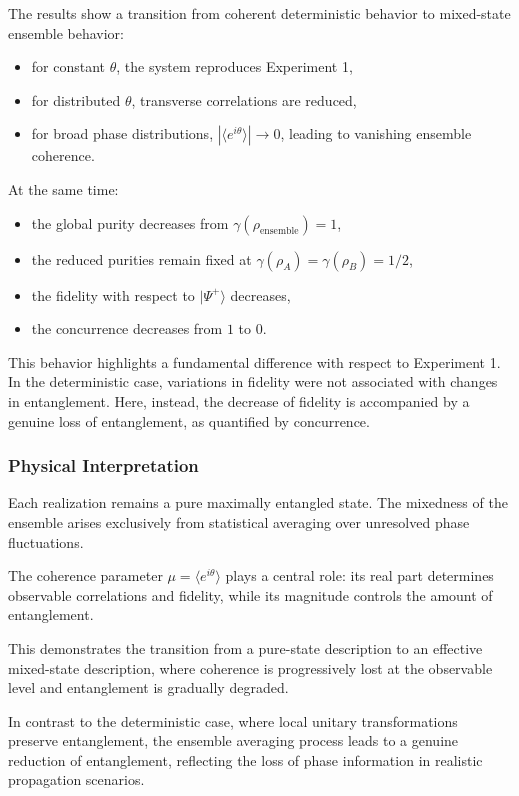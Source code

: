 \documentclass[a4paper]{article}
\begin{document}
The results show a transition from coherent deterministic behavior to mixed-state ensemble behavior:
\begin{itemize}
    \item for constant \(\theta\), the system reproduces Experiment 1,
    \item for distributed \(\theta\), transverse correlations are reduced,
    \item for broad phase distributions, \( |\langle e^{i\theta}\rangle| \to 0 \), leading to vanishing ensemble coherence.
\end{itemize}

At the same time:
\begin{itemize}
    \item the global purity decreases from \(\gamma(\rho_{\mathrm{ensemble}})=1\),
    \item the reduced purities remain fixed at \(\gamma(\rho_A)=\gamma(\rho_B)=1/2\),
    \item the fidelity with respect to \( |\Psi^+\rangle \) decreases,
    \item the concurrence decreases from \(1\) to \(0\).
\end{itemize}

This behavior highlights a fundamental difference with respect to Experiment 1. In the deterministic case, variations in fidelity were not associated with changes in entanglement. Here, instead, the decrease of fidelity is accompanied by a genuine loss of entanglement, as quantified by concurrence.

\subsubsection{Physical Interpretation}

Each realization remains a pure maximally entangled state. The mixedness of the ensemble arises exclusively from statistical averaging over unresolved phase fluctuations.

The coherence parameter \(\mu = \langle e^{i\theta} \rangle\) plays a central role: its real part determines observable correlations and fidelity, while its magnitude controls the amount of entanglement.

This demonstrates the transition from a pure-state description to an effective mixed-state description, where coherence is progressively lost at the observable level and entanglement is gradually degraded.

In contrast to the deterministic case, where local unitary transformations preserve entanglement, the ensemble averaging process leads to a genuine reduction of entanglement, reflecting the loss of phase information in realistic propagation scenarios.
\end{document}
